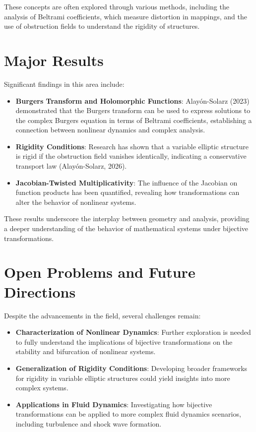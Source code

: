 \documentclass[11pt,a4paper]{article}
\begin{document}
These concepts are often explored through various methods, including the analysis of Beltrami coefficients, which measure distortion in mappings, and the use of obstruction fields to understand the rigidity of structures.

\section{Major Results}
Significant findings in this area include:

\begin{itemize}
\item \textbf{Burgers Transform and Holomorphic Functions}: Alayón-Solarz (2023) demonstrated that the Burgers transform can be used to express solutions to the complex Burgers equation in terms of Beltrami coefficients, establishing a connection between nonlinear dynamics and complex analysis.
\item \textbf{Rigidity Conditions}: Research has shown that a variable elliptic structure is rigid if the obstruction field vanishes identically, indicating a conservative transport law (Alayón-Solarz, 2026).
\item \textbf{Jacobian-Twisted Multiplicativity}: The influence of the Jacobian on function products has been quantified, revealing how transformations can alter the behavior of nonlinear systems.
\end{itemize}

These results underscore the interplay between geometry and analysis, providing a deeper understanding of the behavior of mathematical systems under bijective transformations.

\section{Open Problems and Future Directions}
Despite the advancements in the field, several challenges remain:

\begin{itemize}
\item \textbf{Characterization of Nonlinear Dynamics}: Further exploration is needed to fully understand the implications of bijective transformations on the stability and bifurcation of nonlinear systems.
\item \textbf{Generalization of Rigidity Conditions}: Developing broader frameworks for rigidity in variable elliptic structures could yield insights into more complex systems.
\item \textbf{Applications in Fluid Dynamics}: Investigating how bijective transformations can be applied to more complex fluid dynamics scenarios, including turbulence and shock wave formation.
\end{itemize}
\end{document}
